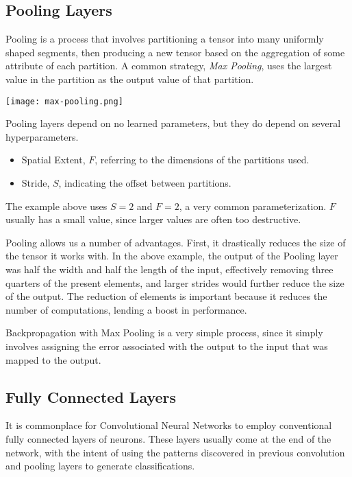 \documentclass[a4paper, 11pt]{article} %
\begin{document}
\subsection*{Pooling Layers}

Pooling is a process that involves partitioning a tensor into many uniformly shaped segments, then producing a new tensor based on the aggregation of some attribute of each partition.  A common strategy, \textit{Max Pooling}, uses the largest value in the partition as the output value of that partition.

\texttt{[image: max-pooling.png]}

Pooling layers depend on no learned parameters, but they do depend on several hyperparameters\cite{stanford}.

\begin{itemize}
	\item Spatial Extent, $F$, referring to the dimensions of the partitions used.
	\item Stride, $S$, indicating the offset between partitions.
\end{itemize}

The example above uses $S=2$ and $F=2$, a very common parameterization.  $F$ usually has a small value, since larger values are often too destructive\cite{stanford}.

Pooling allows us a number of advantages.  First, it drastically reduces the size of the tensor it works with.  In the above example, the output of the Pooling layer was half the width and half the length of the input, effectively removing three quarters of the present elements, and larger strides would further reduce the size of the output.  The reduction of elements is important because it reduces the number of computations, lending a boost in performance.

Backpropagation with Max Pooling is a very simple process, since it simply involves assigning the error associated with the output to the input that was mapped to the output.

\subsection*{Fully Connected Layers}

It is commonplace for Convolutional Neural Networks to employ conventional fully connected layers of neurons.  These layers usually come at the end of the network, with the intent of using the patterns discovered in previous convolution and pooling layers to generate classifications.
\end{document}
